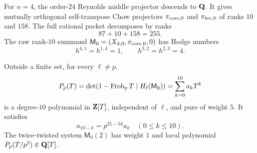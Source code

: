 \begin{theorem}
\label{thm:core-main}
For \(n=4\), the order-\(24\) Reynolds middle projector descends to
\(\mathbf Q\).  It gives mutually orthogonal self-transpose Chow projectors
\(\pi_{\mathrm{core},0}\) and \(\pi_{\mathrm{lev},0}\) of ranks \(10\) and \(158\).
The full rational packet decomposes by ranks
\[
87+10+158=255.
\]
The raw rank-\(10\) summand
\(\mathsf M_0=(X_{4,0},\pi_{\mathrm{core},0},0)\) has Hodge numbers
\[
h^{4,1}=h^{1,4}=1,\qquad h^{3,2}=h^{2,3}=4.
\]
\end{theorem}

\begin{theorem}
\label{thm:compatible-main}
Outside a finite set, for every \(\ell\ne p\),
\[
P_p(T)=\det(1-\operatorname{Frob}_pT\mid H_\ell(\mathsf M_0))
=\sum_{k=0}^{10}a_kT^k
\]
is a degree-\(10\) polynomial in \(\mathbf Z[T]\), independent of \(\ell\), and
pure of weight \(5\).  It satisfies
\[
a_{10-k}=p^{25-5k}a_k
\quad(0\le k\le10).
\]
The twice-twisted system \(\mathsf M_0(2)\) has weight \(1\) and local
polynomial \(P_p(T/p^2)\in\mathbf Q[T]\).
\end{theorem}
